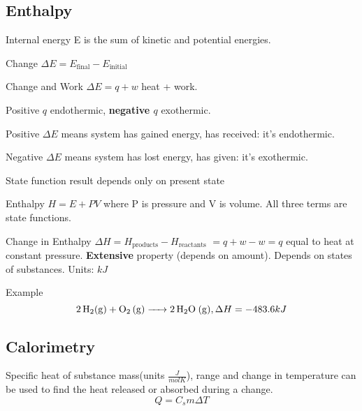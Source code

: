 \begin{mdframed}\begin{multicols}{2}\subsection{Enthalpy}
\begin{compactdesc}
    \item[Internal energy] E is the sum of kinetic and potential energies.
    \item[Change] $\Delta E = E_\text{final} - E_\text{initial}$
    \item[Change and Work] $\Delta E = q + w$ heat + work.
    \item[Positive $q$] endothermic, \textbf{negative $q$} exothermic.
    \item[Positive $\Delta E$] means system has gained energy, has received: it's endothermic.
    \item[Negative $\Delta E$] means system has lost energy, has given: it's exothermic.
    \item[State function] result depends only on present state
    \item[Enthalpy] $H = E + PV$ where P is pressure and V is volume. All three
        terms are state functions.
    \item[Change in Enthalpy] $\Delta H = H_\text{products} -
        H_\text{reactants}$ $= q + w - w = q$ equal to heat at constant
        pressure. \textbf{Extensive} property (depends on amount). Depends on
        states of substances. Units: $kJ$
    \item[Example]
        \[  \ce{2H2(g) + O2 (g) -> 2H2O (g)}, \Delta H = -483.6 kJ
        \]
\end{compactdesc}

\subsection{Calorimetry}
Specific heat of substance mass(units $\frac{J}{molK}$), range and change in
temperature can be used to find the heat released or absorbed during a change.
\[Q = C_sm\Delta T\]
\end{multicols}\end{mdframed}



